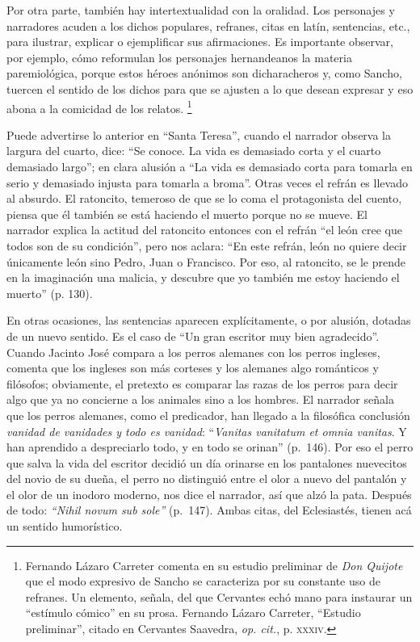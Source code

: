 \documentclass[14pt,twoside,final]{extbook} %
\let\oldfootnote\footnote
\renewcommand\footnote[1]{%
\oldfootnote{\hspace{1mm}#1}}
\begin{document}
Por otra parte, también hay intertextualidad con la oralidad. Los personajes y narradores acuden a los dichos populares, refranes, citas en latín, sentencias, etc., para ilustrar, explicar o ejemplificar sus afirmaciones. Es importante observar, por ejemplo, cómo reformulan los personajes hernandeanos la materia paremiológica, porque estos héroes anónimos son dicharacheros y, como Sancho, tuercen el sentido de los dichos para que se ajusten a lo que desean expresar y eso abona a la comicidad de los relatos.\footnote{Fernando Lázaro Carreter comenta en su estudio preliminar de \emph{Don Quijote} que el modo expresivo de Sancho se caracteriza por su constante uso de refranes. Un elemento, señala, del que Cervantes echó mano para instaurar un ``estímulo cómico'' en su prosa. Fernando Lázaro Carreter, ``Estudio preliminar'', citado en Cervantes Saavedra, \emph{op. cit.}, p. \textsc{xxxiv}.}

Puede advertirse lo anterior en ``Santa Teresa'', cuando el narrador observa la largura del cuarto, dice: ``Se conoce. La vida es demasiado corta y el cuarto demasiado largo''; en clara alusión a ``La vida es demasiado corta para tomarla en serio y demasiado injusta para tomarla a broma''. Otras veces el refrán es llevado al absurdo. El ratoncito, temeroso de que se lo coma el protagonista del cuento, piensa que él también se está haciendo el muerto porque no se mueve. El narrador explica la actitud del ratoncito entonces con el refrán ``el león cree que todos son de su condición'', pero nos aclara: ``En este refrán, león no quiere decir únicamente león sino Pedro, Juan o Francisco. Por eso, al ratoncito, se le prende en la imaginación una malicia, y descubre que yo también me estoy haciendo el muerto'' (p. 130).

En otras ocasiones, las sentencias aparecen explícitamente, o por alusión, dotadas de un nuevo sentido. Es el caso de ``Un gran escritor muy bien agradecido''. Cuando Jacinto José compara a los perros alemanes con los perros ingleses, comenta que los ingleses son más corteses y los alemanes algo románticos y filósofos; obviamente, el pretexto es comparar las razas de los perros para decir algo que ya no concierne a los animales sino a los hombres. El narrador señala que los perros alemanes, como el predicador, han llegado a la filosófica conclusión \emph{vanidad de vanidades y todo es vanidad}: ``\emph{Vanitas vanitatum et omnia vanitas}. Y han aprendido a despreciarlo
todo, y en todo se orinan'' (p.~146). Por eso el perro que salva la vida del escritor decidió un día orinarse en los pantalones nuevecitos del novio de su dueña, el perro no distinguió entre el olor a nuevo del pantalón y el olor de un inodoro moderno, nos dice el narrador, así que alzó la pata. Después de todo: \emph{``Nihil novum sub sole''} (p.~147). Ambas citas, del Eclesiastés, tienen acá un sentido humorístico.
\end{document}
